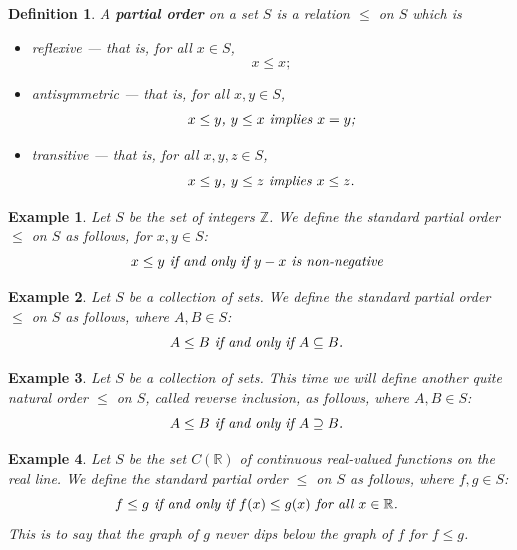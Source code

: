 \documentclass[12pt,reqno]{amsart}
\theoremstyle{plain}
\newtheorem{defi}{Definition}
\newtheorem{ex}{Example}
\newcommand{\rr}{\mathbb R}
\newcommand{\zz}{\mathbb Z}
\begin{document}
\begin{defi} A \textbf{partial order} on a set $S$ is a relation $\leq$ on $S$ which is 
\begin{itemize}
\item[1.] reflexive — that is, for all $x \in S$,
\[ x \leq x; \]

\item[2.] antisymmetric — that is, for all $x, y  \in S$,
\[ \textup{\textit{$x \leq y$, $y \leq x$ implies $ x = y$;}}\] 

\item[3.] transitive — that is, for all $x, y, z \in S$,
\[\textup{\textit{$x \leq y$, $y \leq z$ implies $x \leq z$.}} \]
\end{itemize}
\end{defi} 
\begin{ex} Let $S$ be the set of integers $\zz$. We define the standard partial order $\leq$ on $S$ as follows, for $x, y \in S$: \[ \textup{\textit{$x \leq y$ if and only if $y-x$ is non-negative }} \]
\end{ex} 
\begin{ex} Let $S$ be a collection of sets. We define the standard partial order $\leq$ on $S$ as follows, where $A,B \in S$: \[ \textup{\textit{$A \leq B$ if and only if $A \subseteq B$. }} \]
\end{ex} 
\begin{ex} Let $S$ be a collection of sets. This time we will define another quite natural order $\leq$ on $S$, called \textit{reverse inclusion}, as follows, where $A,B \in S$: \[ \textup{\textit{$A \leq B$ if and only if $ A \supseteq B$. }} \]
\end{ex} 
\begin{ex} Let $S$ be the set $C(\rr)$ of continuous real-valued functions on the real line. We define the standard partial order $\leq$ on $S$ as follows, where $f, g \in S$: \[ \textup{\textit{$f \leq g$ if and only if $f(x) \leq g(x)$ for all $x \in \rr$. }} \]
This is to say that the graph of $g$ never dips below the graph of $f$ for $f \leq g$.
\end{ex} 
\end{document}
